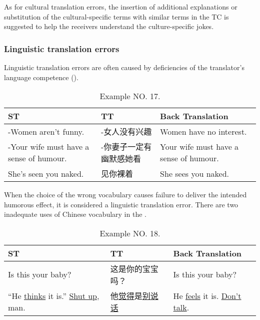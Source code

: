\documentclass[english]{textolivre}
\begin{document}
As for cultural translation errors, the insertion of additional explanations or substitution of the cultural-specific terms with similar terms in the TC is suggested to help the receivers understand the culture-specific jokes.

\subsubsection{Linguistic translation errors}
Linguistic translation errors are often caused by deficiencies of the translator's language competence \cite{rahmatillah_translation_2013} ().

\begin{table}[htpb]
\caption{Example NO. 17.}
\label{tbl17}
\begin{tabularx}{\linewidth}{XXX}
\toprule 
ST  & TT & Back Translation \\ 
\midrule
-Women aren't funny. & -女人没有兴趣 &  Women have no interest.  \\

-Your wife must have a sense of humour.  & -你妻子一定有幽默感她看 & Your wife must have a sense of humour.  \\

She's seen you naked.  & 
见你裸着 & She sees you naked. \\ 
\bottomrule
\end{tabularx}
\end{table}

When the choice of the wrong vocabulary causes failure to deliver the intended humorous effect, it is considered a linguistic translation error. There are two inadequate uses of Chinese vocabulary in the .

\begin{table}[htpb]
\caption{Example NO. 18.}
\label{tbl18}
\begin{tabularx}{\linewidth}{XXX}
\toprule 
ST  & TT & Back Translation \\ 
\midrule
Is this your baby? & 这是你的宝宝吗？ & Is this your baby? \\

“He \underline{thinks} it is.” \underline{Shut up}, man.  & 他\underline{觉得}是\underline{别说话} &  He \underline{feels} it is. \underline{Don't talk}. \\ 
\bottomrule
\end{tabularx}
\end{table}
\end{document}
